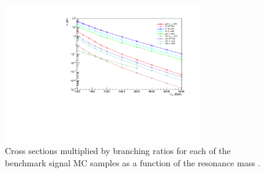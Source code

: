 \begin{figure}[htbp]
  \centering
  \includegraphics[width=0.75\textwidth]{fig/samples/sigCrossSec.pdf}
  \caption{
    Cross sections multiplied by branching ratios for each of the benchmark signal MC samples as a function of the resonance mass \MX.
  }
  \label{fig:sigCrossSec}
\end{figure}

%  

%  

%  

